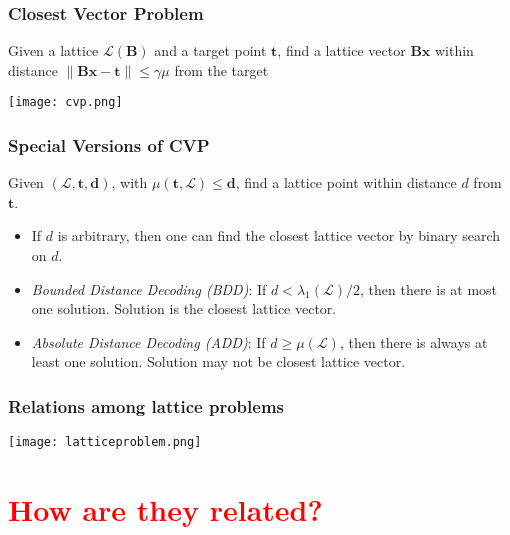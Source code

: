 \documentclass{beamer}
\begin{document}
\begin{frame}
	\frametitle{Closest Vector Problem}
	\begin{definition}
		Given a lattice $\mathcal{L}(\mathbf{B})$ and a target point $\mathbf{t}$, find a lattice vector $\mathbf{B x}$ within distance $\|\mathbf{B} \mathbf{x}-\mathbf{t}\| \leq \gamma \mu$ from the target
		
	\end{definition}
	
	\texttt{[image: cvp.png]}
	

\end{frame}



\begin{frame}
	\frametitle{Special Versions of CVP}

	\begin{definition}
		Given $(\mathcal{L}, \mathbf{t}, \boldsymbol{d})$, with $\mu(\mathbf{t}, \mathcal{L}) \leq \boldsymbol{d}$, find a lattice point within distance $d$ from $\boldsymbol{t}$.
	\end{definition}
	
	\begin{itemize}
		\item If $d$ is arbitrary, then one can find the closest lattice vector by binary search on $d$.
		\item \emph{Bounded Distance Decoding (BDD)}: If $d<\lambda_1(\mathcal{L}) / 2$, then there is at most one solution. Solution is the closest lattice vector.
		\item \emph{Absolute Distance Decoding (ADD)}: If $d \geq \mu(\mathcal{L})$, then there is always at least one solution. Solution may not be closest lattice vector.


	\end{itemize}
\end{frame}



\begin{frame}
	\frametitle{Relations among lattice problems}
	\texttt{[image: latticeproblem.png]}

\end{frame}




\section{\textcolor{red}{How are they related?}}
\end{document}
